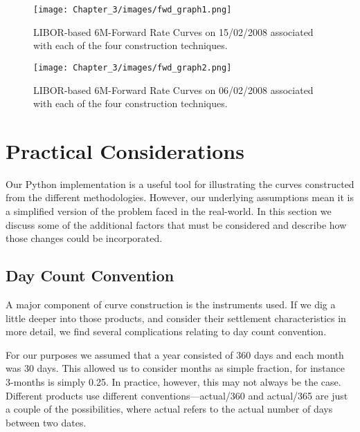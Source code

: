 \begin{figure}[ht]
\begin{center}
\texttt{[image: Chapter\_3/images/fwd\_graph1.png]}
\caption[LIBOR-based 6M-Forward Curves using different construction techniques on 15/02/2008]{LIBOR-based 6M-Forward Rate Curves on 15/02/2008 associated with each of the four construction techniques.}
\label{fig:curves_3}
\end{center}
\end{figure}

\begin{figure}[ht]
\begin{center}
\texttt{[image: Chapter\_3/images/fwd\_graph2.png]}
\caption[LIBOR-based 6M-Forward Curves using different construction techniques on 06/02/2008]{LIBOR-based 6M-Forward Rate Curves on 06/02/2008 associated with each of the four construction techniques.}
\label{fig:curves_4}
\end{center}
\end{figure}

\FloatBarrier

\section{Practical Considerations}
Our Python implementation is a useful tool for illustrating the curves constructed from the different methodologies. However, our underlying assumptions mean it is a simplified version of the problem faced in the real-world. In this section we discuss some of the additional factors that must be considered and describe how those changes could be incorporated.

\subsection{Day Count Convention}
A major component of curve construction is the instruments used. If we dig a little deeper into those products, and consider their settlement characteristics in more detail, we find several complications relating to day count convention.

For our purposes we assumed that a year consisted of 360 days and each month was 30 days. This allowed us to consider months as simple fraction, for instance 3-months is simply 0.25. In practice, however, this may not always be the case. Different products use different conventions––actual/360 and actual/365 are just a couple of the possibilities, where actual refers to the actual number of days between two dates. 

